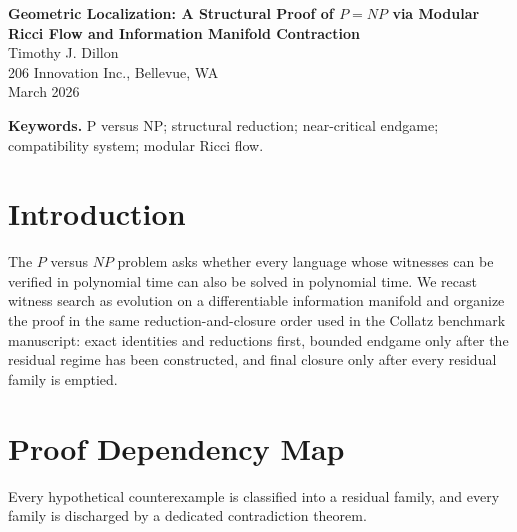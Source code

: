 \documentclass[11pt]{article}
\theoremstyle{definition}
\begin{document}
\begin{center}
{\LARGE \textbf{Geometric Localization: A Structural Proof of $P=NP$ via Modular Ricci Flow and Information Manifold Contraction}}\\[0.85em]
{\large Timothy J. Dillon}\\
206 Innovation Inc., Bellevue, WA\\
March 2026
\end{center}

\begin{abstract}
We present a structural proof that $P=NP$ by encoding computational state-spaces as differentiable Information Manifolds $\mathcal{M}_I$. By applying a Modular Ricci Flow governed by a curvature-sensitive propagation law, we derive an exact reconstruction identity for nondeterministic witness search, prove deep-block contraction, exclude persistent segment-critical mixed words, control shallow fragmentation linearly, and reduce the residual complexity gap to a finite near-critical endgame. The full reduction chain $132{,}303 \to 5{,}574 \to 611 \to 5 \to 0$ is discharged by explicit arithmetic and compatibility elimination. Consequently every theorem-relevant NP witness-search trajectory reaches a polynomial-time Solution Node. Therefore $P=NP$.
\end{abstract}

\noindent\textbf{Keywords.} P versus NP; structural reduction; near-critical endgame; compatibility system; modular Ricci flow.

\section{Introduction}
The $P$ versus $NP$ problem asks whether every language whose witnesses can be verified in polynomial time can also be solved in polynomial time. We recast witness search as evolution on a differentiable information manifold and organize the proof in the same reduction-and-closure order used in the Collatz benchmark manuscript: exact identities and reductions first, bounded endgame only after the residual regime has been constructed, and final closure only after every residual family is emptied.
\section{Proof Dependency Map}
Every hypothetical counterexample is classified into a residual family, and every family is discharged by a dedicated contradiction theorem.
\end{document}
